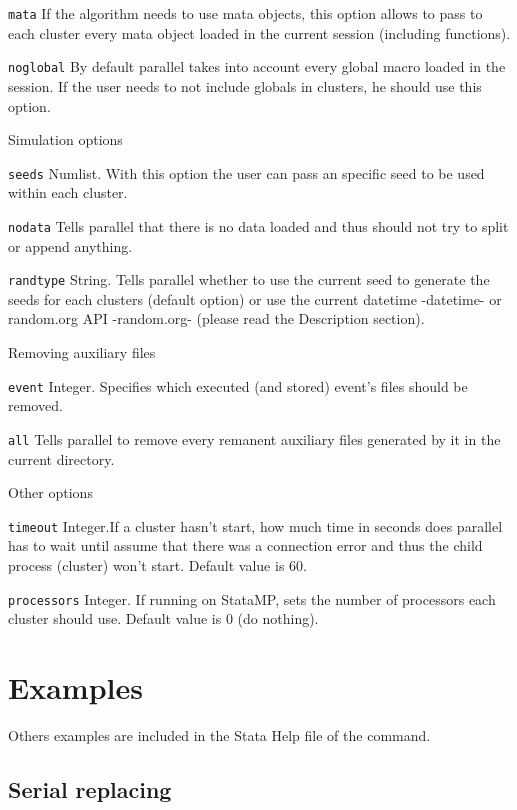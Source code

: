 \documentclass[bib]{statapress}
\begin{document}
\hangpara
{\tt mata} If the algorithm needs to use mata objects, this option allows to pass to each cluster every mata object loaded in the current session (including functions).

\hangpara
{\tt noglobal} By default parallel takes into account every global macro loaded in the session. If the user needs to not include globals in clusters, he should use this option.

\noindent Simulation options

\hangpara
{\tt seeds}  Numlist. With this option the user can pass an specific seed to be used within each cluster.

\hangpara
{\tt nodata} Tells parallel that there is no data loaded and thus should not try to split or append anything.

\hangpara
{\tt randtype} String. Tells parallel whether to use the current seed to generate the seeds for each clusters (default option) or use the current datetime -datetime- or random.org API -random.org- (please read the Description section).

\noindent Removing auxiliary files

\hangpara
{\tt event} Integer. Specifies which executed (and stored) event's files should be removed.

\hangpara
{\tt all} Tells parallel to remove every remanent auxiliary files generated by it in the current directory.

\noindent Other options

\hangpara
{\tt timeout} Integer.If a cluster hasn't start, how much time in seconds does parallel has to wait until assume that there was a connection error and thus the child process (cluster) won't start. Default value is 60.

\hangpara
{\tt processors} Integer. If running on StataMP, sets the number of processors each cluster should use. Default value is 0 (do nothing).



\section{Examples}

Others examples are included in the Stata Help file of the command.

\subsection{Serial replacing}
\end{document}

